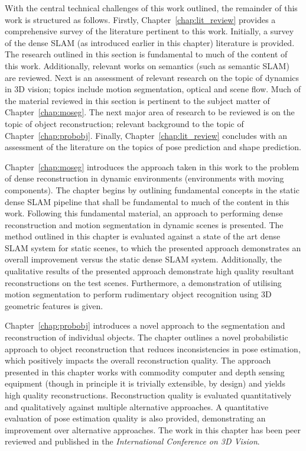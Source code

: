 With the central technical challenges of this work outlined, the remainder of this work is structured 
as follows. Firstly, Chapter~\ref{chap:lit_review} provides a comprehensive survey of the literature 
pertinent to this work. Initially, a survey of the dense SLAM (as introduced earlier in this chapter) 
literature is provided. The research outlined in this section is fundamental to much of the content of 
this work. Additionally, relevant works on semantics (such as semantic SLAM) are reviewed. 
Next is an assessment of relevant research on the topic of dynamics in 3D vision; topics include motion 
segmentation, optical and scene flow. Much of the material reviewed in this section is pertinent to the 
subject matter of Chapter~\ref{chap:moseg}. The next major area of research to be reviewed is on the topic 
of object reconstruction; relevant background to the topic of Chapter~\ref{chap:probobj}. Finally, 
Chapter~\ref{chap:lit_review} concludes with an assessment of the literature on the topics of pose prediction 
and shape prediction.

Chapter~\ref{chap:moseg} introduces the approach taken in this work to the problem of dense reconstruction 
in dynamic environments (environments with moving components). The chapter begins by outlining fundamental 
concepts in the static dense SLAM pipeline that shall be fundamental to much of the content in this work. 
Following this fundamental material, an approach to performing dense reconstruction and motion segmentation 
in dynamic scenes is presented. The method outlined in this chapter is evaluated against a state of the art 
dense SLAM system for static scenes, to which the presented approach demonstrates an overall improvement 
versus the static dense SLAM system. Additionally, the qualitative results of the presented approach 
demonstrate high quality resultant reconstructions on the test scenes. Furthermore, a demonstration of 
utilising motion segmentation to perform rudimentary object recognition using 3D geometric features is 
given.

Chapter~\ref{chap:probobj} introduces a novel approach to the segmentation and reconstruction of individual 
objects. The chapter outlines a novel probabilistic approach to object reconstruction that reduces 
inconsistencies in pose estimation, which positively impacts the overall reconstruction quality. The 
approach presented in this chapter works with commodity computer and depth sensing equipment (though in 
principle it is trivially extensible, by design) and yields high quality reconstructions. Reconstruction 
quality is evaluated quantitatively and qualitatively against multiple alternative approaches. A 
quantitative evaluation of pose estimation quality is also provided, demonstrating an improvement over 
alternative approaches. The work in this chapter has been peer reviewed and published in the 
\textit{International Conference on 3D Vision}\footnotemark.

